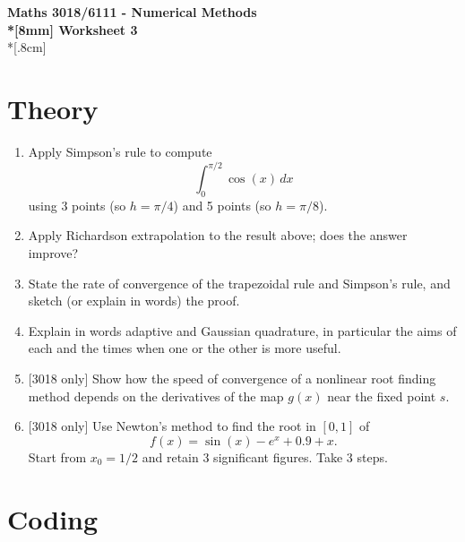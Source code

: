 \documentclass[10pt]{article}
\begin{document}
\thispagestyle{empty}
\begin{center}
\textbf{\Large Maths 3018/6111 - Numerical Methods \\*[8mm]
Worksheet 3}\\*[.8cm]
\end{center}

\section*{Theory}

\begin{enumerate}
\item Apply Simpson's rule to compute
  \begin{equation*}
    \int_0^{\pi/2} \cos(x) \, dx
  \end{equation*}
  using 3 points (so $h = \pi / 4$) and 5 points (so $h = \pi / 8$).
\item Apply Richardson extrapolation to the result above; does the
  answer improve?
\item State the rate of convergence of the trapezoidal rule and
  Simpson's rule, and sketch (or explain in words) the proof.
\item Explain in words adaptive and Gaussian quadrature, in particular
  the aims of each and the times when one or the other is more useful.
\item{} [3018 only] Show how the speed of convergence of a nonlinear
  root finding method depends on the derivatives of the map $g(x)$
  near the fixed point $s$.
\item{} [3018 only] Use Newton's method to find the root in $[0,1]$ of
  \begin{equation*}
    f(x) = \sin(x) - e^x + 0.9 + x.
  \end{equation*}
  Start from $x_0=1/2$ and retain 3 significant figures. Take 3 steps.
\end{enumerate}

\section*{Coding}
\end{document}
